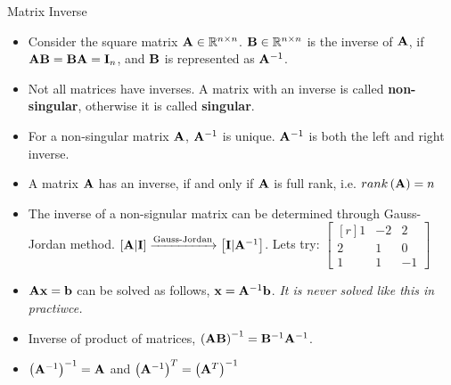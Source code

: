 \documentclass[aspectratio=169]{beamer}
\def\mf{\ensuremath\mathbf}
\begin{document}
\begin{frame}[t]{Matrix Inverse}
\begin{small}
\begin{itemize}
    \item Consider the square matrix $\mf{A} \in \mathbb{R}^{n \times n}$. $\mf{B} \in \mathbb{R}^{n \times n}$ is the inverse of $\mf{A}$, if $\mf{AB} = \mf{BA} = \mf{I}_n$, and $\mf{B}$ is represented as $\mf{A}^{-1}$.
    \item Not all matrices have inverses. A matrix with an inverse is called \textbf{non-singular}, otherwise it is called \textbf{singular}.
    \item For a non-singular matrix $\mf{A}$, $\mf{A}^{-1}$ is unique. $\mf{A}^{-1}$ is both the left and right inverse.
    \item A matrix $\mf{A}$ has an inverse, if and only if $\mf{A}$ is full rank, i.e. $rank\left(\mf{A}\right) = n$
    \item The inverse of a non-signular matrix can be determined through Gauss-Jordan method. $\left[\mf{A} | \mf{I}\right] \xrightarrow[\text{}]{\text{Gauss-Jordan}} \left[\mf{I} | \mf{A}^{-1}\right]$. Lets try: $\begin{bmatrix*}[r]1 & -2 & 2\\2 & 1 & 0\\1 & 1 & -1\end{bmatrix*}$
    \item $\mf{Ax} = \mf{b}$ can be solved as follows, $\mf{x} = \mf{A}^{-1}\mf{b}$. \textit{It is never solved like this in practiwce.}
    \item Inverse of product of matrices, $\left(\mf{AB}\right)^{-1} = \mf{B}^{-1}\mf{A}^{-1}$.
    \item $\left(\mf{A}^{-1}\right)^{-1} = \mf{A}$ and $\left(\mf{A}^{-1}\right)^T = \left(\mathbf{A}^{T}\right)^{-1}$
\end{itemize}
\end{small}
\end{frame}
\end{document}
